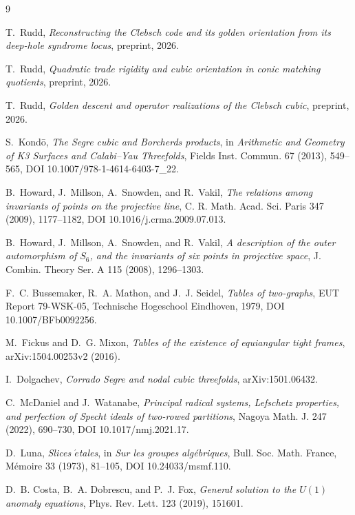 \documentclass[11pt]{article}
\theoremstyle{definition}
\theoremstyle{remark}
\begin{document}
\begin{thebibliography}{9}

T.~Rudd,
\emph{Reconstructing the Clebsch code and its golden orientation from its
deep-hole syndrome locus},
preprint, 2026.

T.~Rudd,
\emph{Quadratic trade rigidity and cubic orientation in conic matching
quotients},
preprint, 2026.

T.~Rudd,
\emph{Golden descent and operator realizations of the Clebsch cubic},
preprint, 2026.

S.~Kond\=o,
\emph{The Segre cubic and Borcherds products},
in \emph{Arithmetic and Geometry of K3 Surfaces and Calabi--Yau
Threefolds}, Fields Inst. Commun. 67 (2013), 549--565,
DOI 10.1007/978-1-4614-6403-7\_22.

B.~Howard, J.~Millson, A.~Snowden, and R.~Vakil,
\emph{The relations among invariants of points on the projective line},
C. R. Math. Acad. Sci. Paris 347 (2009), 1177--1182,
DOI 10.1016/j.crma.2009.07.013.

B.~Howard, J.~Millson, A.~Snowden, and R.~Vakil,
\emph{A description of the outer automorphism of \(S_6\), and the
invariants of six points in projective space},
J. Combin. Theory Ser. A 115 (2008), 1296--1303.

F.~C. Bussemaker, R.~A. Mathon, and J.~J. Seidel,
\emph{Tables of two-graphs},
EUT Report 79-WSK-05, Technische Hogeschool Eindhoven, 1979,
DOI 10.1007/BFb0092256.

M.~Fickus and D.~G. Mixon,
\emph{Tables of the existence of equiangular tight frames},
arXiv:1504.00253v2 (2016).

I.~Dolgachev,
\emph{Corrado Segre and nodal cubic threefolds},
arXiv:1501.06432.

C.~McDaniel and J.~Watanabe,
\emph{Principal radical systems, Lefschetz properties, and perfection of
Specht ideals of two-rowed partitions},
Nagoya Math. J. 247 (2022), 690--730,
DOI 10.1017/nmj.2021.17.

D.~Luna,
\emph{Slices \(\acute{e}\)tales},
in \emph{Sur les groupes alg\'ebriques},
Bull. Soc. Math. France, M\'emoire 33 (1973), 81--105,
DOI 10.24033/msmf.110.

D.~B. Costa, B.~A. Dobrescu, and P.~J. Fox,
\emph{General solution to the \(U(1)\) anomaly equations},
Phys. Rev. Lett. 123 (2019), 151601.


\end{thebibliography}
\end{document}
